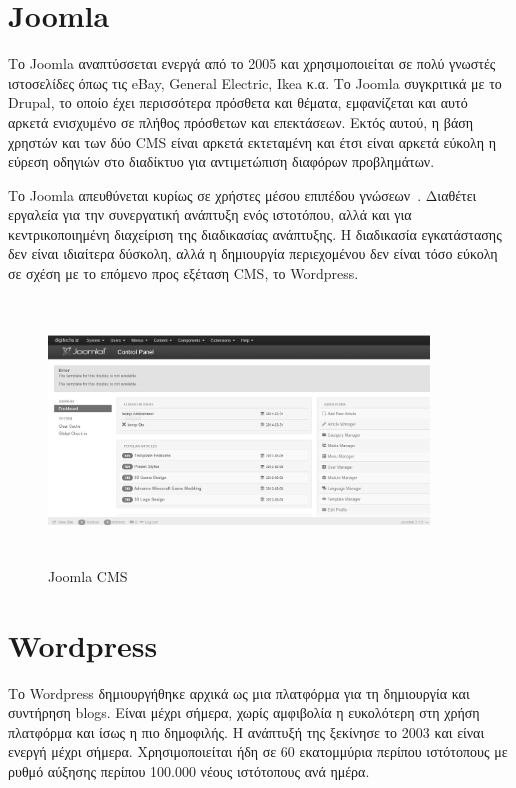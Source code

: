 \documentclass[12pt]{report}
\begin{document}
\section{\textlatin{Joomla}}
Το \textlatin{Joomla} αναπτύσσεται ενεργά από το 2005 και χρησιμοποιείται σε πολύ γνωστές ιστοσελίδες όπως τις \textlatin{eBay, General Electric, Ikea} κ.α. Το \textlatin{Joomla} συγκριτικά με το \textlatin{Drupal}, το οποίο έχει περισσότερα πρόσθετα και θέματα, εμφανίζεται και αυτό αρκετά ενισχυμένο σε πλήθος πρόσθετων και επεκτάσεων. Εκτός αυτού, η βάση χρηστών και των δύο \textlatin{CMS} είναι αρκετά εκτεταμένη και έτσι είναι αρκετά εύκολη η εύρεση οδηγιών στο διαδίκτυο για αντιμετώπιση διαφόρων προβλημάτων.

Το \textlatin{Joomla} απευθύνεται κυρίως σε χρήστες μέσου επιπέδου γνώσεων~\cite{pixelmedia}. Διαθέτει εργαλεία για την συνεργατική ανάπτυξη ενός ιστοτόπου, αλλά και για κεντρικοποιημένη διαχείριση της διαδικασίας ανάπτυξης. Η διαδικασία εγκατάστασης δεν είναι ιδιαίτερα δύσκολη, αλλά η δημιουργία περιεχομένου δεν είναι τόσο εύκολη σε σχέση με το επόμενο προς εξέταση \textlatin{CMS}, το \textlatin{Wordpress}.
\begin{figure}[H]
\centering
\includegraphics[width=0.9\textwidth, height=7cm]{joomla-gray}
\caption{\textlatin{Joomla CMS}}
\label{fig:joomla}
\end{figure}

\section{\textlatin{Wordpress}}
Το \textlatin{Wordpress} δημιουργήθηκε αρχικά ως μια πλατφόρμα για τη δημιουργία και συντήρηση \textlatin{blogs}. Είναι μέχρι σήμερα, χωρίς αμφιβολία η ευκολότερη στη χρήση πλατφόρμα και ίσως η πιο δημοφιλής. Η ανάπτυξή της ξεκίνησε το 2003 και είναι ενεργή μέχρι σήμερα. Χρησιμοποιείται ήδη σε 60 εκατομμύρια περίπου ιστότοπους με ρυθμό αύξησης περίπου 100.000 νέους ιστότοπους ανά ημέρα.
\end{document}
